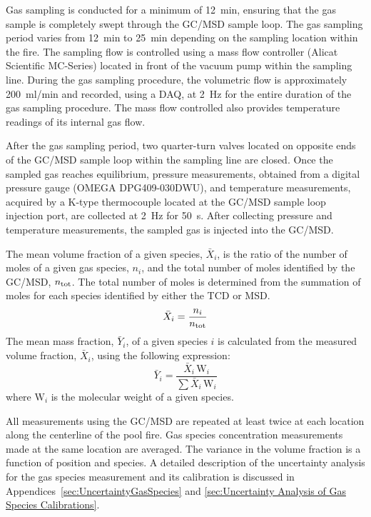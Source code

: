 \documentclass[12pt]{article}
\begin{document}
Gas sampling is conducted for a minimum of \SI{12}{min}, ensuring that the gas sample is completely swept through the GC/MSD sample loop. The gas sampling period varies from \SI{12}{min} to \SI{25}{min} depending on the sampling location within the fire. The sampling flow is controlled using a mass flow controller (Alicat Scientific MC-Series) located in front of the vacuum pump within the sampling line. During the gas sampling procedure, the volumetric flow is approximately \SI{200}{ml/min} and recorded, using a DAQ, at \SI{2}{\hertz} for the entire duration of the gas sampling procedure. The mass flow controlled also provides temperature readings of its internal gas flow.

After the gas sampling period, two quarter-turn valves located on opposite ends of the GC/MSD sample loop within the sampling line are closed. Once the sampled gas reaches equilibrium, pressure measurements, obtained from a digital pressure gauge (OMEGA DPG409-030DWU), and temperature measurements, acquired by a K-type thermocouple located at the GC/MSD sample loop injection port, are collected at \SI{2}{\hertz} for \SI{50}{s}. After collecting pressure and temperature measurements, the sampled gas is injected into the GC/MSD.

The mean volume fraction of a given species, $\bar{X}_{i}$, is the ratio of the number of moles of a given gas species, $n_{i}$, and the total number of moles identified by the GC/MSD, $n_{\rm tot}$. The total number of moles is determined from the summation of moles for each species identified by either the TCD or MSD.
\begin{equation}\label{eq:volume_fraction}
  	\bar{X}_{i}= \frac{n_{i}}{n_{\rm tot}}
\end{equation}
The mean mass fraction, $\bar{Y}_{i}$, of a given species $i$ is calculated from the measured volume fraction, $\bar{X}_{i}$, using the following expression:
\begin{equation}\label{eq:mass_fraction}
	\bar{Y}_{i}=\frac{\bar{X}_{i} \, {\textrm{W}_{i}}}{\sum{\bar{X}_{i} \, {\textrm{W}_{i}}}}
\end{equation}
where ${{\textrm{W}_{i}}}$ is the molecular weight of a given species.

All measurements using the GC/MSD are repeated at least twice at each location along the centerline of the pool fire. Gas species concentration measurements made at the same location are averaged. The variance in the volume fraction is a function of position and species. A detailed description of the uncertainty analysis for the gas species measurement and its calibration is discussed in Appendices~\ref{sec:UncertaintyGasSpecies} and \ref{sec:Uncertainty Analysis of Gas Species Calibrations}.
\end{document}
